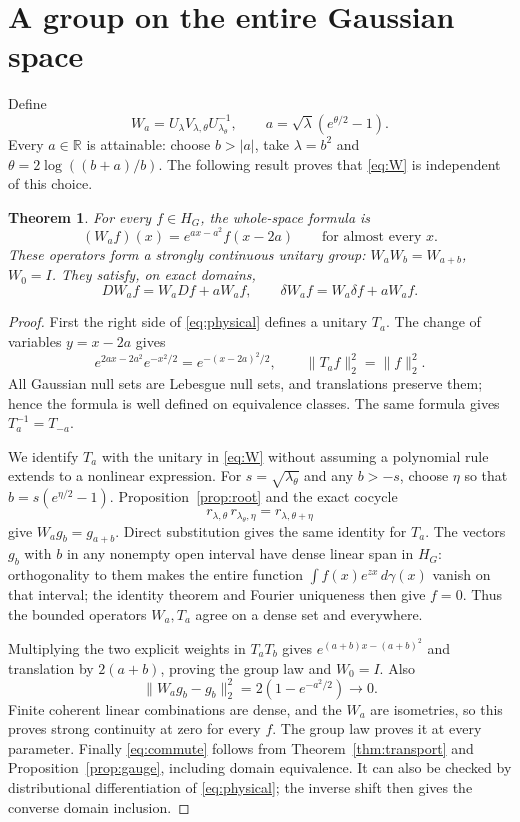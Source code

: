 \documentclass[11pt]{article}
\newtheorem{theorem}{Theorem}[section]
\newcommand{\R}{\mathbb R}\newcommand{\N}{\mathbb N}
\begin{document}
\section{A group on the entire Gaussian space}
Define
\begin{equation}\label{eq:W}
 W_a=U_\lambda V_{\lambda,\theta}U_{\lambda_\theta}^{-1},
 \qquad a=\sqrt\lambda(e^{\theta/2}-1).
\end{equation}
Every $a\in\R$ is attainable: choose $b>|a|$, take $\lambda=b^2$
and $\theta=2\log((b+a)/b)$. The following result proves that
\eqref{eq:W} is independent of this choice.

\begin{theorem}\label{thm:physical}
For every $f\in H_G$, the whole-space formula is
\begin{equation}\label{eq:physical}
 (W_af)(x)=e^{ax-a^2}f(x-2a)\qquad\text{for almost every }x.
\end{equation}
These operators form a strongly continuous unitary group:
$W_aW_b=W_{a+b}$, $W_0=I$. They satisfy, on exact domains,
\begin{equation}\label{eq:commute}
 DW_af=W_aDf+aW_af,\qquad
 \delta W_af=W_a\delta f+aW_af.
\end{equation}
\end{theorem}
\begin{proof}
First the right side of \eqref{eq:physical} defines a unitary $T_a$.
The change of variables $y=x-2a$ gives
\[
 e^{2ax-2a^2}e^{-x^2/2}=e^{-(x-2a)^2/2},\qquad
 \|T_af\|_2^2=\|f\|_2^2.
\]
All Gaussian null sets are Lebesgue null sets, and translations preserve
them; hence the formula is well defined on equivalence classes.
The same formula gives $T_a^{-1}=T_{-a}$.

We identify $T_a$ with the unitary in \eqref{eq:W} without assuming a
polynomial rule extends to a nonlinear expression. For $s=\sqrt{
\lambda_\theta}$ and any $b>-s$, choose $\eta$ so that
$b=s(e^{\eta/2}-1)$. Proposition~\ref{prop:root} and the exact cocycle
\[
 r_{\lambda,\theta}\,r_{\lambda_\theta,\eta}
 =r_{\lambda,\theta+\eta}
\]
give $W_ag_b=g_{a+b}$. Direct substitution gives the same identity
for $T_a$. The vectors $g_b$ with $b$ in any nonempty open interval
have dense linear span in $H_G$: orthogonality to them makes the
entire function $\int f(x)e^{zx}\,d\gamma(x)$ vanish on that interval;
the identity theorem and Fourier uniqueness then give $f=0$.
Thus the bounded operators $W_a,T_a$ agree on a dense set and everywhere.

Multiplying the two explicit weights in $T_aT_b$ gives
$e^{(a+b)x-(a+b)^2}$ and translation by $2(a+b)$, proving the group
law and $W_0=I$. Also
\[
 \|W_ag_b-g_b\|_2^2=2(1-e^{-a^2/2})\longrightarrow0.
\]
Finite coherent linear combinations are dense, and the $W_a$ are
isometries, so this proves strong continuity at zero for every $f$.
The group law proves it at every parameter.
Finally \eqref{eq:commute} follows from
Theorem~\ref{thm:transport} and Proposition~\ref{prop:gauge}, including
domain equivalence. It can also be checked by distributional
differentiation of \eqref{eq:physical}; the inverse shift then gives
the converse domain inclusion.
\end{proof}
\end{document}
